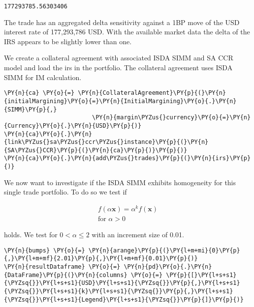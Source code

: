             \begin{tcolorbox}[breakable, size=fbox, boxrule=.5pt, pad at break*=1mm, opacityfill=0]
\begin{Verbatim}[commandchars=\\\{\}]
177293785.56303406
\end{Verbatim}
\end{tcolorbox}
        
    The trade has an aggregated delta sensitivity against a 1BP move of the
USD interest rate of 177,293,786 USD. With the available market data the
delta of the IRS appears to be slightly lower than one.

    
    We create a collateral agreement with associated ISDA SIMM and SA CCR
model and load the irs in the portfolio. The collateral agreement uses
ISDA SIMM for IM calculation.

    \begin{tcolorbox}[breakable, size=fbox, boxrule=1pt, pad at break*=1mm,colback=cellbackground, colframe=cellborder]
\begin{Verbatim}[commandchars=\\\{\}]
\PY{n}{ca} \PY{o}{=} \PY{n}{CollateralAgreement}\PY{p}{(}\PY{n}{initialMargining}\PY{o}{=}\PY{n}{InitialMargining}\PY{o}{.}\PY{n}{SIMM}\PY{p}{,}
                         \PY{n}{margin\PYZus{}currency}\PY{o}{=}\PY{n}{Currency}\PY{o}{.}\PY{n}{USD}\PY{p}{)}
\PY{n}{ca}\PY{o}{.}\PY{n}{link\PYZus{}sa\PYZus{}ccr\PYZus{}instance}\PY{p}{(}\PY{n}{SA\PYZus{}CCR}\PY{p}{(}\PY{n}{ca}\PY{p}{)}\PY{p}{)}
\PY{n}{ca}\PY{o}{.}\PY{n}{add\PYZus{}trades}\PY{p}{(}\PY{n}{irs}\PY{p}{)}
\end{Verbatim}
\end{tcolorbox}

    We now want to investigate if the ISDA SIMM exhibits homogeneity for
this single trade portfolio. To do so we test if

\begin{align*}
f\left(\alpha \mathbf{x}\right) = \alpha^k f\left(\mathbf{x}\right) \\
        \text{for } \alpha >0
\end{align*}

holds. We test for \(0<\alpha\leq 2\) with an increment size of 0.01.

    \begin{tcolorbox}[breakable, size=fbox, boxrule=1pt, pad at break*=1mm,colback=cellbackground, colframe=cellborder]
\begin{Verbatim}[commandchars=\\\{\}]
\PY{n}{bumps} \PY{o}{=} \PY{n}{arange}\PY{p}{(}\PY{l+m+mi}{0}\PY{p}{,}\PY{l+m+mf}{2.01}\PY{p}{,}\PY{l+m+mf}{0.01}\PY{p}{)}
\PY{n}{resultDataframe} \PY{o}{=} \PY{n}{pd}\PY{o}{.}\PY{n}{DataFrame}\PY{p}{(}\PY{n}{columns} \PY{o}{=} \PY{p}{[}\PY{l+s+s1}{\PYZsq{}}\PY{l+s+s1}{USD}\PY{l+s+s1}{\PYZsq{}}\PY{p}{,}\PY{l+s+s1}{\PYZsq{}}\PY{l+s+s1}{k}\PY{l+s+s1}{\PYZsq{}}\PY{p}{,}\PY{l+s+s1}{\PYZsq{}}\PY{l+s+s1}{Legend}\PY{l+s+s1}{\PYZsq{}}\PY{p}{]}\PY{p}{)}
\end{Verbatim}
\end{tcolorbox}

